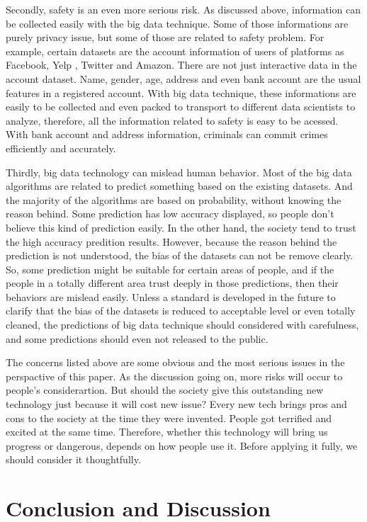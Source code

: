 Secondly, safety is an even more serious risk. As discussed above, 
information can be collected easily with the big data technique. 
Some of those informations are purely privacy issue, but some of 
those are related to safety problem. For example, certain datasets 
are the account information of users of platforms as Facebook, Yelp
, Twitter and Amazon. There are not just interactive data in the 
account dataset. Name, gender, age, address and even bank account
are the usual features in a registered account. With big data 
technique, these informations are easily to be collected and even
packed to transport to different data scientists to analyze, 
therefore, all the information related to safety is easy to be 
acessed. With bank account and address information, criminals can
commit crimes efficiently and accurately.

Thirdly, big data technology can mislead human behavior. Most of 
the big data algorithms are related to predict something based on 
the existing datasets. And the majority of the algorithms are based
on probability, without knowing the reason behind. Some prediction
has low accuracy displayed, so people don't believe this kind of 
prediction easily. In the other hand, the society tend to trust the
high accuracy predition results. However, because the reason behind
the prediction is not understood, the bias of the datasets can not 
be remove clearly. So, some prediction might be suitable for 
certain areas of people, and if the people in a totally different 
area trust deeply in those predictions, then their behaviors are
mislead easily. Unless a standard is developed in the future to 
clarify that the bias of the datasets is reduced to acceptable 
level or even totally cleaned, the predictions of big data 
technique should considered with carefulness, and some predictions
should even not released to the public.

The concerns listed above are some obvious and the most serious 
issues in the perspactive of this paper. As the discussion going 
on, 
more risks will occur to people's considerartion. But should the 
society give this outstanding new technology just because it will
cost new issue? Every new tech brings pros and cons to the society
at the time they were invented. People got terrified and excited 
at the same time. Therefore, whether this technology will bring us
progress or dangerous, depends on how people use it. Before 
applying it fully, we should consider it thoughtfully.


\section{Conclusion and Discussion}

